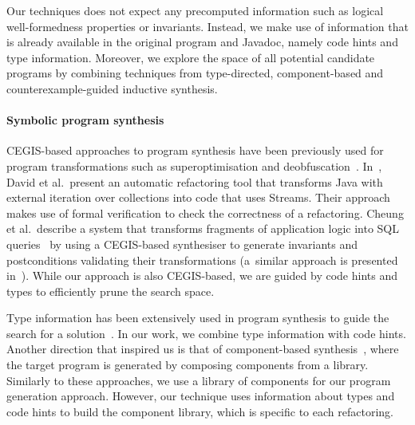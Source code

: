 \documentclass[sigconf]{acmart}
\begin{document}
Our techniques does not expect any
precomputed information such as logical well-formedness properties or
invariants. Instead, we make use of information that is already
available in the original program and Javadoc, namely code hints and
type information. Moreover, we explore the space of all potential
candidate programs by combining techniques from type-directed,
component-based and counterexample-guided inductive synthesis.

\paragraph{Symbolic program synthesis}

CEGIS-based approaches to program synthesis have been previously used for
program transformations such as superoptimisation and
deobfuscation~\cite{DBLP:conf/icse/JhaGST10}.
In~\cite{DBLP:journals/corr/abs-1712-07388}, David et al.~present an
automatic refactoring tool that transforms Java with external iteration over
collections into code that uses Streams.  Their approach makes use of formal
verification to check the correctness of a refactoring.  Cheung et
al.~describe a system that
transforms fragments of application
logic into SQL queries~\cite{DBLP:conf/pldi/CheungSM13} by using a
CEGIS-based synthesiser to generate invariants and postconditions
validating their transformations (a~similar approach is presented
in~\cite{DBLP:conf/cc/IuCZ10}).  While our approach is also CEGIS-based,
we are guided by code hints and types to efficiently prune the
search space.  %

%
Type information has been extensively used in program synthesis to guide the
search for a
solution~\cite{DBLP:conf/sfp/Katayama05,DBLP:conf/pldi/FeserCD15,DBLP:conf/pldi/OseraZ15,DBLP:journals/pacmpl/LubinCOC20,DBLP:journals/pacmpl/YamaguchiMDW21}.
In our work, we combine type information with code hints.
%
%
%
Another direction that inspired us is that of component-based
synthesis~\cite{DBLP:conf/icse/JhaGST10,DBLP:conf/pldi/GulwaniJTV11,DBLP:conf/popl/FengM0DR17},
where the target program is generated by composing components from a
library.  Similarly to these approaches, we use a library of components for
our program generation approach.  However, our technique uses information
about types and code hints to build the component library, which is specific
to each refactoring.
\end{document}
